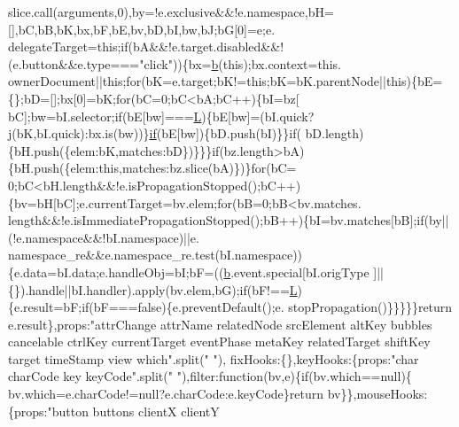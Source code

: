 \begin{DoxyCode}
      slice.call(arguments,0),by=!e.exclusive&&!e.namespace,bH=[],bC,bB,bK,bx,bF,bE,bv,bD,bI,bw,bJ;bG[0]=e;e.
      delegateTarget=\textcolor{keyword}{this};\textcolor{keywordflow}{if}(bA&&!e.target.disabled&&!(e.button&&e.type===\textcolor{stringliteral}{"click"}))\{bx=\hyperlink{docs_2_programmer's_manual_2html_2jquery_8js_aa4026ad5544b958e54ce5e106fa1c805}{b}(\textcolor{keyword}{this});bx.context=this.
      ownerDocument||\textcolor{keyword}{this};\textcolor{keywordflow}{for}(bK=e.target;bK!=\textcolor{keyword}{this};bK=bK.parentNode||\textcolor{keyword}{this})\{bE=\{\};bD=[];bx[0]=bK;\textcolor{keywordflow}{for}(bC=0;bC<bA;bC++)\{bI=bz[
      bC];bw=bI.selector;\textcolor{keywordflow}{if}(bE[bw]===\hyperlink{docs_2_programmer's_manual_2html_2jquery_8js_a38ee4c0b5f4fe2a18d0c783af540d253}{L})\{bE[bw]=(bI.quick?j(bK,bI.quick):bx.is(bw))\}\hyperlink{docs_2_programmer's_manual_2html_2jquery_8js_a9db6d45a025ad692282fe23e69eeba43}{if}(bE[bw])\{bD.push(bI)\}\}\textcolor{keywordflow}{if}(
      bD.length)\{bH.push(\{elem:bK,matches:bD\})\}\}\}\textcolor{keywordflow}{if}(bz.length>bA)\{bH.push(\{elem:\textcolor{keyword}{this},matches:bz.slice(bA)\})\}\textcolor{keywordflow}{for}(bC=
      0;bC<bH.length&&!e.isPropagationStopped();bC++)\{bv=bH[bC];e.currentTarget=bv.elem;\textcolor{keywordflow}{for}(bB=0;bB<bv.matches.
      length&&!e.isImmediatePropagationStopped();bB++)\{bI=bv.matches[bB];\textcolor{keywordflow}{if}(by||(!e.namespace&&!bI.namespace)||e.
      namespace\_re&&e.namespace\_re.test(bI.namespace))\{e.data=bI.data;e.handleObj=bI;bF=((\hyperlink{docs_2_programmer's_manual_2html_2jquery_8js_aa4026ad5544b958e54ce5e106fa1c805}{b}.event.special[bI.origType
      ]||\{\}).handle||bI.handler).apply(bv.elem,bG);\textcolor{keywordflow}{if}(bF!==\hyperlink{docs_2_programmer's_manual_2html_2jquery_8js_a38ee4c0b5f4fe2a18d0c783af540d253}{L})\{e.result=bF;\textcolor{keywordflow}{if}(bF===\textcolor{keyword}{false})\{e.preventDefault();e.
      stopPropagation()\}\}\}\}\}\textcolor{keywordflow}{return} e.result\},props:\textcolor{stringliteral}{"attrChange attrName relatedNode srcElement altKey bubbles
       cancelable ctrlKey currentTarget eventPhase metaKey relatedTarget shiftKey target timeStamp view which"}.split(\textcolor{stringliteral}{" "}),
      fixHooks:\{\},keyHooks:\{props:\textcolor{stringliteral}{"char charCode key keyCode"}.split(\textcolor{stringliteral}{" "}),filter:\textcolor{keyword}{function}(bv,e)\{\textcolor{keywordflow}{if}(bv.which==null)\{
      bv.which=e.charCode!=null?e.charCode:e.keyCode\}\textcolor{keywordflow}{return} bv\}\},mouseHooks:\{props:\textcolor{stringliteral}{"button buttons clientX clientY
}
\end{DoxyCode}

